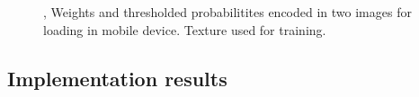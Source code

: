 \documentclass[10pt,twocolumn, a4paper]{article}
\begin{document}
\begin{figure}[t]
    \centering

 

    \caption{ \protect {} , \protect{} Weights and thresholded probabilitites encoded in two images for loading in mobile device. \protect {} Texture used for training.}
    \label{TSamples1}
\end{figure}

\subsection{Implementation results}
\label{iresults}
\end{document}
